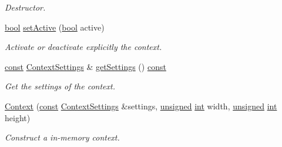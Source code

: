 \begin{DoxyCompactItemize}
\begin{DoxyCompactList}\small\item\em Destructor. \end{DoxyCompactList}\item 
\hyperlink{term__entry_8h_a002004ba5d663f149f6c38064926abac}{bool} \hyperlink{classsf_1_1_context_a0806f915ea81ae1f4e8135a7a3696562}{set\-Active} (\hyperlink{term__entry_8h_a002004ba5d663f149f6c38064926abac}{bool} active)
\begin{DoxyCompactList}\small\item\em Activate or deactivate explicitly the context. \end{DoxyCompactList}\item 
\hyperlink{term__entry_8h_a57bd63ce7f9a353488880e3de6692d5a}{const} \hyperlink{structsf_1_1_context_settings}{Context\-Settings} \& \hyperlink{classsf_1_1_context_a07e5f65a13e7ef6bbc267ed66a530766}{get\-Settings} () \hyperlink{term__entry_8h_a57bd63ce7f9a353488880e3de6692d5a}{const} 
\begin{DoxyCompactList}\small\item\em Get the settings of the context. \end{DoxyCompactList}\item 
\hyperlink{classsf_1_1_context_a2a9e3529e48919120e6b6fc10bad296c}{Context} (\hyperlink{term__entry_8h_a57bd63ce7f9a353488880e3de6692d5a}{const} \hyperlink{structsf_1_1_context_settings}{Context\-Settings} \&settings, \hyperlink{curses_8priv_8h_aca40206900cfc164654362fa8d4ad1e6}{unsigned} \hyperlink{term__entry_8h_ad65b480f8c8270356b45a9890f6499ae}{int} width, \hyperlink{curses_8priv_8h_aca40206900cfc164654362fa8d4ad1e6}{unsigned} \hyperlink{term__entry_8h_ad65b480f8c8270356b45a9890f6499ae}{int} height)
\begin{DoxyCompactList}\small\item\em Construct a in-\/memory context. \end{DoxyCompactList}\end{DoxyCompactItemize}
